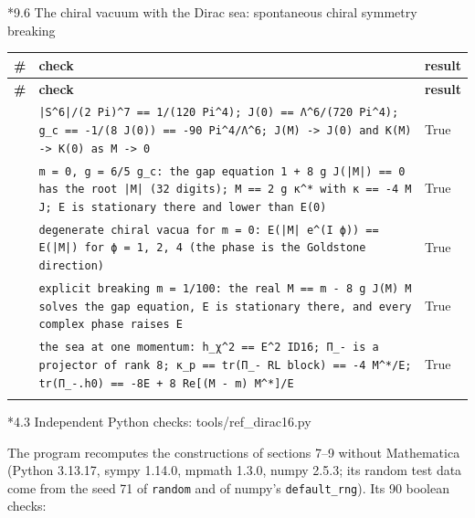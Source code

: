 \documentclass[10pt,a4paper]{article}
\makeatletter
\renewcommand\subsection{\@startsection{subsection}{2}{\z@}{-3.25ex\@plus -1ex \@minus -.2ex}{1.5ex \@plus .2ex}{\normalfont\large\bfseries\raggedright}}
\renewcommand\subsubsection{\@startsection{subsubsection}{3}{\z@}{-3.25ex\@plus -1ex \@minus -.2ex}{1.5ex \@plus .2ex}{\normalfont\normalsize\bfseries\raggedright}}
\makeatother
\begin{document}
\subsubsection*{9.6 The chiral vacuum with the Dirac sea: spontaneous chiral symmetry breaking}
{\footnotesize
\begin{longtable}{>{\raggedright\arraybackslash}p{}>{\raggedright\arraybackslash}p{}>{\raggedright\arraybackslash}p{}}
\toprule
\textbf{\#} & \textbf{check} & \textbf{result} \\
\midrule\endfirsthead
\toprule
\textbf{\#} & \textbf{check} & \textbf{result} \\
\midrule\endhead
\endfoot
\bottomrule\endlastfoot
70 & \texttt{|S\textasciicircum{}6|/\allowbreak{}(2 Pi)\textasciicircum{}7 == 1/\allowbreak{}(120 Pi\textasciicircum{}4); J(0) == Λ\textasciicircum{}6/\allowbreak{}(720 Pi\textasciicircum{}4); g\_\allowbreak{}c == -1/\allowbreak{}(8 J(0)) == -90 Pi\textasciicircum{}4/\allowbreak{}Λ\textasciicircum{}6; J(M) -> J(0) and K(M) -> K(0) as M -> 0} & True \\
71 & \texttt{m = 0, g = 6/\allowbreak{}5 g\_\allowbreak{}c: the gap equation 1 + 8 g J(|M|) == 0 has the root |M| (32 digits); M == 2 g κ\textasciicircum{}* with κ == -4 M J; E is stationary there and lower than E(0)} & True \\
72 & \texttt{degenerate chiral vacua for m = 0: E(|M| e\textasciicircum{}(I ϕ)) == E(|M|) for ϕ = 1, 2, 4 (the phase is the Goldstone direction)} & True \\
73 & \texttt{explicit breaking m = 1/\allowbreak{}100: the real M == m - 8 g J(M) M solves the gap equation, E is stationary there, and every complex phase raises E} & True \\
74 & \texttt{the sea at one momentum: h\_\allowbreak{}χ\textasciicircum{}2 == E\textasciicircum{}2 ID16; Π\_\allowbreak{}- is a projector of rank 8; κ\_\allowbreak{}p == tr(Π\_\allowbreak{}- RL block) == -4 M\textasciicircum{}*/\allowbreak{}E; tr(Π\_\allowbreak{}-.h0) == -8E + 8 Re[(M - m) M\textasciicircum{}*]/\allowbreak{}E} & True \\*
\end{longtable}}
\subsection*{4.3 Independent Python checks: tools/ref\_dirac16.py}
The program recomputes the constructions of sections 7–9 without Mathematica (Python 3.13.17, sympy 1.14.0, mpmath 1.3.0, numpy 2.5.3; its random test data come from the seed 71 of \texttt{random} and of numpy’s \texttt{default\_\allowbreak{}rng}). Its 90 boolean checks:
\end{document}

